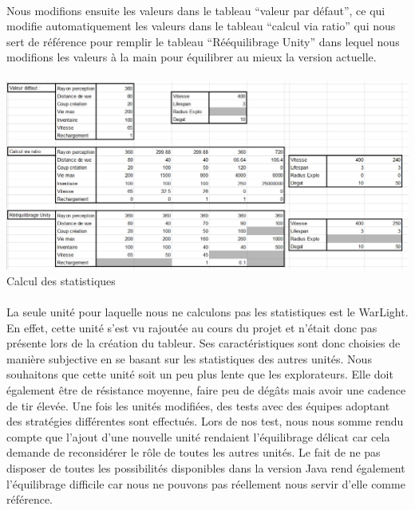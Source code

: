 \documentclass{report}
\begin{document}
\paragraph{}
Nous modifions ensuite les valeurs dans le tableau “valeur par défaut”, ce qui modifie automatiquement les valeurs dans le tableau “calcul via ratio” qui nous sert de référence pour remplir le tableau “Rééquilibrage Unity” dans lequel nous modifions les valeurs à la main pour équilibrer au mieux la version actuelle.

\paragraph{}
\begin{adjustwidth}{-3em}{}
\includegraphics[scale=0.55]{DATA/equilibrage.png}
 {Calcul des statistiques}
\end{adjustwidth}
\paragraph{}

    La seule unité pour laquelle nous ne calculons pas les statistiques est le WarLight. En effet, cette unité s’est vu rajoutée au cours du projet et n’était donc pas présente lors de la création du tableur. Ses caractéristiques sont donc choisies de manière subjective en se basant sur les statistiques des autres unités. Nous souhaitons que cette unité soit un peu plus lente que les explorateurs. Elle doit également être de résistance moyenne, faire peu de dégâts mais avoir une cadence de tir élevée. \newline
Une fois les unités modifiées, des tests avec des équipes adoptant des stratégies différentes sont effectués. Lors de nos test, nous nous somme rendu compte que l’ajout d’une nouvelle unité rendaient l’équilibrage délicat car cela demande de reconsidérer le rôle de toutes les autres unités. Le fait de ne pas disposer de toutes les possibilités disponibles dans la version Java rend également l’équilibrage difficile car nous ne pouvons pas réellement nous servir d’elle comme référence.
\end{document}
